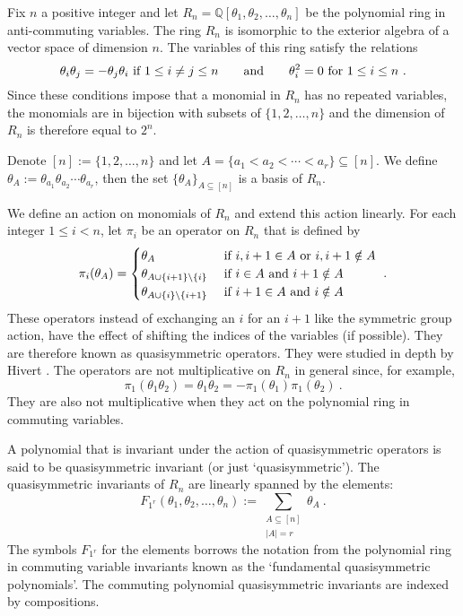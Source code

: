 \documentclass[11pt]{amsart}
\theoremstyle{definition}
\numberwithin{equation}{section}
\begin{document}
Fix $n$ a positive integer and
let $R_n = {\mathbb Q}[\theta_1, \theta_2, \ldots, \theta_n]$ be the
polynomial ring in anti-commuting variables.
The ring $R_n$ is isomorphic to the exterior algebra of a vector
space of dimension $n$.  The variables of this ring satisfy the relations
\[
\theta_i \theta_j = - \theta_j \theta_i \hbox{ if } 1 \leq i \neq j \leq n
\qquad\hbox{and}\qquad \theta_i^2 = 0 \hbox{ for }1 \leq i \leq n~.
\]
Since these conditions impose that a monomial in $R_n$ has no repeated variables,
the monomials are in bijection with subsets of $\{1,2,\ldots, n\}$
and the dimension of $R_n$ is therefore equal to $2^n$.

Denote $[n] := \{1,2, \ldots,n\}$ and
let $A = \{a_1 < a_2 < \cdots < a_r \} \subseteq [n]$.
We define $\theta_A := \theta_{a_1} \theta_{a_2} \cdots \theta_{a_r}$,
then the set $\{ \theta_A \}_{A \subseteq [n]}$ is a basis of $R_n$.

We define an action on monomials of $R_n$ and extend this action linearly.
For each integer $1 \leq i < n$, let $\pi_i$ be an operator on $R_n$
that is defined by
\begin{equation}\label{eq:pi}
\pi_i(\theta_A) = \begin{cases}
\theta_{A} & \hbox{ if } i, i+1 \in A\hbox{ or }i, i+1 \notin A\\
\theta_{A \cup \{i+1\} \backslash \{i\}} & \hbox{ if } i\in A\hbox{ and }i+1 \notin A\\
\theta_{A \cup \{i\} \backslash \{i+1\}} & \hbox{ if } i+1\in A\hbox{ and }i \notin A
\end{cases}~.
\end{equation}
These operators instead of exchanging an $i$ for an $i+1$ like the symmetric group
action, have the effect of shifting the indices of the variables (if possible).  They
are therefore known as quasisymmetric operators.  They were studied in depth by
Hivert \cite{Hi}.  The operators are not multiplicative on $R_n$ in general since, for example,
\[
\pi_1( \theta_{1} \theta_{2})
= \theta_1 \theta_2
= - \pi_1( \theta_{1}) \pi_1(\theta_{2})~.
\]
They are also not multiplicative when they act on the polynomial ring
in commuting variables.

A polynomial that is invariant under the action of quasisymmetric operators
is said to be quasisymmetric invariant (or just `quasisymmetric').
The quasisymmetric invariants of $R_n$ are
linearly spanned by the elements:
\begin{equation}\label{eq:defF}
F_{1^r}(\theta_1, \theta_2, \ldots, \theta_n) := \sum_{\substack{A \subseteq [n]\\|A|=r}} \theta_A~.
\end{equation}
The symbols $F_{1^r}$ for the elements borrows the notation from the
polynomial ring in commuting variable invariants known as the `fundamental
quasisymmetric polynomials'.  The commuting polynomial quasisymmetric
invariants are indexed by compositions.
\end{document}
